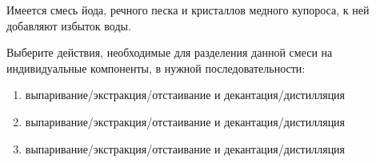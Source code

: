 
Имеется смесь йода,
речного песка и кристаллов медного купороса, к ней добавляют избыток воды. 

Выберите действия,
необходимые для разделения данной смеси на индивидуальные компоненты, в нужной
последовательности:

\begin{enumerate}
    \item выпаривание/экстракция/отстаивание и декантация/дистилляция
    \item выпаривание/экстракция/отстаивание и декантация/дистилляция
    \item выпаривание/экстракция/отстаивание и декантация/дистилляция
\end{enumerate}

